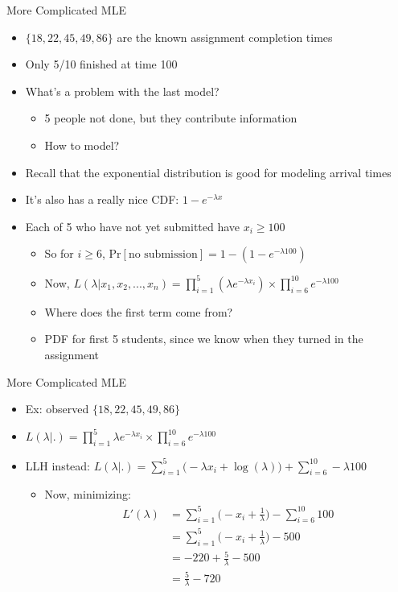 \documentclass[aspectratio=169]{beamer}
\begin{document}
\begin{frame}{More Complicated MLE}

\begin{itemize}
\item $\{18, 22, 45, 49, 86\}$ are the known assignment completion times
\item Only 5/10 finished at time 100
\item What's a problem with the last model?
	\begin{itemize}
	\item 5 people not done, but they contribute information
	\item How to model?
	\end{itemize}
\item Recall that the exponential distribution is good for modeling arrival times
\item It's also has a really nice CDF: $1- e^{-\lambda x}$
\item Each of 5 who have not yet submitted have $x_i \geq 100$
	\begin{itemize}
	\item So for $i \geq 6$, Pr$[\textrm{no submission}] = 1 - (1 - e^{-\lambda 100})$
	\item Now, $L (\lambda | x_1, x_2, ..., x_n) = \prod_{i = 1}^5 ( \lambda e^{-\lambda x_i}) \times
			\prod_{i = 6}^{10} e^{-\lambda 100}$
	\item Where does the first term come from? 
	\item	 PDF for first 5 students, since we know when they turned in the assignment
	\end{itemize}
\end{itemize}
\end{frame}

\begin{frame}{More Complicated MLE}


\begin{itemize}
\item Ex: observed $\{18, 22, 45, 49, 86\}$
\item $L(\lambda | .) = \prod_{i = 1}^5 \lambda e^{-\lambda x_i} \times \prod_{i = 6}^{10} e^{-\lambda 100}$
\item LLH instead: $L(\lambda | .) = \sum_{i = 1}^5 \Big(-\lambda x_i + \log (\lambda) \Big)+
		\sum_{i = 6}^{10} -\lambda 100$
\begin{itemize}
	\item Now, minimizing:
	\begin{align}
		L'(\lambda) &= \sum_{i = 1}^5 \Big( -x_i + \frac{1}{\lambda}\Big) - \sum_{i = 6}^{10} 100 \nonumber \\
			&=  \sum_{i = 1}^5 \Big(-x_i + \frac{1}{\lambda}\Big) - 500 	\nonumber \\
			& = -220 + \frac{5}{\lambda} - 500	\nonumber \\
			&= \frac{5}{\lambda} - 720 \nonumber
	\end{align}
\end{itemize}
\end{itemize}
\end{frame}
\end{document}
